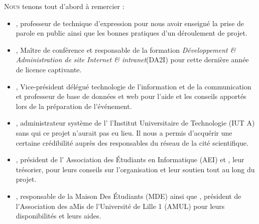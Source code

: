 \lettrine{N}{ous} tenons tout d'abord à remercier :\\

\begin{itemize}

\item {}, professeur de technique d'expression pour nous
avoir enseigné la prise de parole en public ainsi que les bonnes
pratiques d'un déroulement de projet.

\item {}, Maître de conférence et responsable de la
formation \emph{Développement \& Administration de site Internet \&
intranet}(DA2I) pour cette dernière année de licence captivante.

\item {}, Vice-président délégué technologie de
l'information et de la communication et professeur de base de données et
web pour l'aide et les conseils apportés lors de la préparation de
l'événement.

\item {}, administrateur système de l' \og l'Institut
Universitaire de Technologie \fg{} (IUT A) sans qui ce projet n'aurait pas
eu lieu. Il nous a permis d'acquérir une certaine crédibilité auprès des
responsables du réseau de la cité scientifique.

\item {}, président de l' \og Association des Étudiants en
Informatique \fg{} (AEI) et , leur trésorier, pour
leurs conseils sur l'organisation et leur soutien tout au long du
projet.

\item {}, responsable de la \og Maison Des Étudiants \fg{}
(MDE) ainsi que , président de l'\og Association des aMis
de l'Université de Lille 1 \fg{} (AMUL) pour leurs disponibilités et
leurs aides.

\end{itemize}
